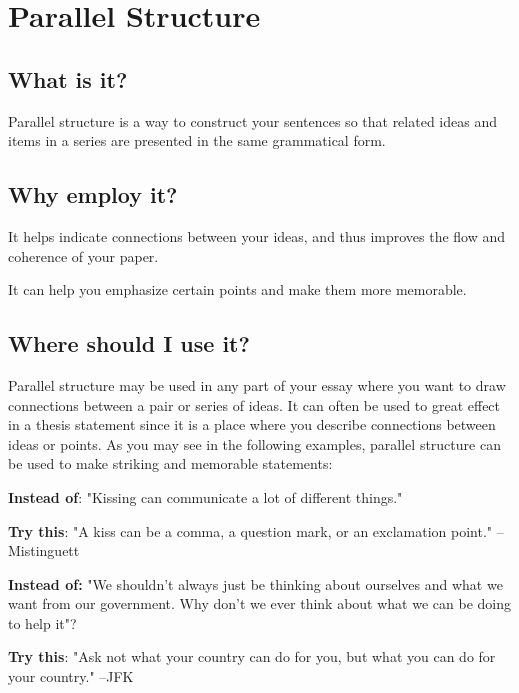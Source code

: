 \chapter{Parallel Structure}

\section{What is it?}

Parallel structure is a way to construct your sentences so that related ideas and items 
in a series are presented in the same grammatical form.

\section{Why employ it?}

It helps indicate connections between your ideas, and thus improves the flow and 
coherence of your paper.

It can help you emphasize certain points and make them more memorable.

\section{Where should I use it?}

Parallel structure may be used in any part of your essay where you want to draw 
connections between a pair or series of ideas. It can often be used to great effect in a 
thesis statement since it is a place where you describe connections between ideas or 
points. As you may see in the following examples, parallel structure can be used to make 
striking and memorable statements:

\textbf{Instead of}: "Kissing can communicate a lot of different things." 

\textbf{Try this}: "A kiss can be a comma, a question mark, or an exclamation point." 
--Mistinguett

\textbf{Instead of:} "We shouldn't always just be thinking about ourselves and what 
we want from our government. Why don't we ever think about what we can be doing to help it"?

\textbf{Try this}: "Ask not what your country can do for you, but what you can do for 
your country." --JFK

